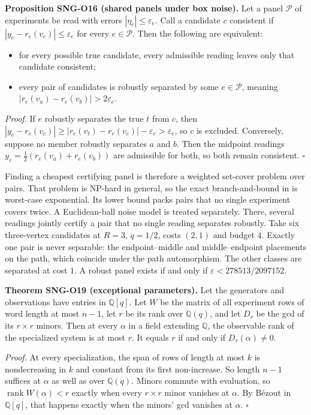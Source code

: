 \documentclass[
  11pt,
  a4paper,
]{report}
\providecommand{\tightlist}{%
  \setlength{\itemsep}{0pt}\setlength{\parskip}{0pt}}
\let\singularitytexttt\texttt
\renewcommand{\texttt}[1]{\singularitytexttt{\seqsplit{#1}}}
\begin{document}
\textbf{Proposition SNG-O16 (shared panels under box noise).} Let a
panel \(\mathcal P\) of experiments be read with errors
\(|\eta_e|\le\varepsilon_e\). Call a candidate \(c\) consistent if
\(|y_e-r_e(v_c)|\le\varepsilon_e\) for every \(e\in\mathcal P\). Then
the following are equivalent:

\begin{itemize}
\tightlist
\item
  for every possible true candidate, every admissible reading leaves
  only that candidate consistent;
\item
  every pair of candidates is robustly separated by some
  \(e\in\mathcal P\), meaning \(|r_e(v_a)-r_e(v_b)|>2\varepsilon_e\).
\end{itemize}

\emph{Proof.} If \(e\) robustly separates the true \(t\) from \(c\),
then
\(|y_e-r_e(v_c)|\ge|r_e(v_t)-r_e(v_c)|-\varepsilon_e>\varepsilon_e\), so
\(c\) is excluded. Conversely, suppose no member robustly separates
\(a\) and \(b\). Then the midpoint readings
\(y_e=\tfrac12(r_e(v_a)+r_e(v_b))\) are admissible for both, so both
remain consistent. \(\square\)

Finding a cheapest certifying panel is therefore a weighted set-cover
problem over pairs. That problem is NP-hard in general, so the exact
branch-and-bound in \texttt{panels.py} is worst-case exponential. Its
lower bound packs pairs that no single experiment covers twice. A
Euclidean-ball noise model is treated separately. There, several
readings jointly certify a pair that no single reading separates
robustly. Take six three-vertex candidates at \(R=3\), \(q=1/2\), costs
\((2,1)\) and budget \(4\). Exactly one pair is never separable: the
endpoint--middle and middle--endpoint placements on the path, which
coincide under the path automorphism. The other classes are separated at
cost \(1\). A robust panel exists if and only if
\(\varepsilon<278513/2097152\).

\textbf{Theorem SNG-O19 (exceptional parameters).} Let the generators
and observations have entries in \(\mathbb Q[q]\). Let \(W\) be the
matrix of all experiment rows of word length at most \(n-1\), let \(r\)
be its rank over \(\mathbb Q(q)\), and let \(D_r\) be the gcd of its
\(r\times r\) minors. Then at every \(\alpha\) in a field extending
\(\mathbb Q\), the observable rank of the specialized system is at most
\(r\). It equals \(r\) if and only if \(D_r(\alpha)\ne0\).

\emph{Proof.} At every specialization, the span of rows of length at
most \(k\) is nondecreasing in \(k\) and constant from its first
non-increase. So length \(n-1\) suffices at \(\alpha\) as well as over
\(\mathbb Q(q)\). Minors commute with evaluation, so
\(\operatorname{rank}W(\alpha)<r\) exactly when every \(r\times r\)
minor vanishes at \(\alpha\). By Bézout in \(\mathbb Q[q]\), that
happens exactly when the minors' gcd vanishes at \(\alpha\). \(\square\)
\end{document}

